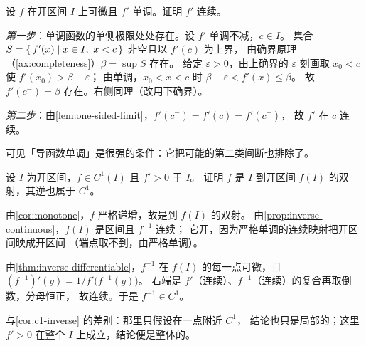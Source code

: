 \begin{exercise}[延伸]
  \label{exr:monotone-derivative-continuous}
  设 \(f\) 在开区间 \(I\) 上可微且 \(f'\) 单调。证明 \(f'\) 连续。
  \begin{solution}
    \emph{第一步}：单调函数的单侧极限处处存在。设 \(f'\) 单调不减，\(c \in I\)。
    集合 \(S = \setst{f'(x)}{x \in I,\ x<c}\) 非空且以 \(f'(c)\) 为上界，
    由确界原理（\cref{ax:completeness}）\(\beta = \sup S\) 存在。
    给定 \(\varepsilon>0\)，由上确界的 \(\varepsilon\) 刻画取 \(x_{0}<c\) 使 \(f'(x_{0})>\beta-\varepsilon\)；
    由单调，\(x_{0}<x<c\) 时 \(\beta-\varepsilon < f'(x) \le \beta\)。
    故 \(f'(c^{-})=\beta\) 存在。右侧同理（改用下确界）。

    \emph{第二步}：由\cref{lem:one-sided-limit}，\(f'(c^{-}) = f'(c) = f'(c^{+})\)，
    故 \(f'\) 在 \(c\) 连续。

    可见「导函数单调」是很强的条件：它把可能的第二类间断也排除了。
  \end{solution}
\end{exercise}

\begin{exercise}[延伸]
  \label{exr:c1-diffeomorphism}
  设 \(I\) 为开区间，\(f \in C^{1}(I)\) 且 \(f'>0\) 于 \(I\)。
  证明 \(f\) 是 \(I\) 到开区间 \(f(I)\) 的双射，其逆也属于 \(C^{1}\)。
  \begin{solution}
    由\cref{cor:monotone}，\(f\) 严格递增，故是到 \(f(I)\) 的双射。
    由\cref{prop:inverse-continuous}，\(f(I)\) 是区间且 \(f^{-1}\) 连续；
    它开，因为严格单调的连续映射把开区间映成开区间
    （端点取不到，由严格单调）。

    由\cref{thm:inverse-differentiable}，\(f^{-1}\) 在 \(f(I)\) 的每一点可微，且
    \((f^{-1})'(y) = 1/f'\bigl(f^{-1}(y)\bigr)\)。
    右端是 \(f'\)（连续）、\(f^{-1}\)（连续）的复合再取倒数，分母恒正，
    故连续。于是 \(f^{-1} \in C^{1}\)。

    与\cref{cor:c1-inverse} 的差别：那里只假设在一点附近 \(C^{1}\)，
    结论也只是局部的；这里 \(f'>0\) 在整个 \(I\) 上成立，结论便是整体的。
  \end{solution}
\end{exercise}
